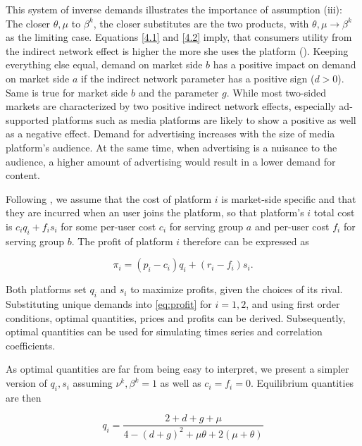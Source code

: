 \documentclass[12pt,a4paper,notitlepage]{article}
\begin{document}
This system of inverse demands illustrates the importance of assumption (iii): The closer $\theta, \mu$ to $\beta^k$, the closer substitutes are the two products, with $\theta, \mu \to \beta^ k$ as the limiting case. Equations \ref{4.1} and \ref{4.2} imply, that consumers utility from the indirect network effect is higher the more she uses the platform (\cite{kind_business_2009}). Keeping everything else equal, demand on market side $b$ has a positive impact on demand on market side $a$ if the indirect network parameter has a positive sign ($d > 0$). Same is true for market side $b$ and the parameter $g$. While most two-sided markets are characterized by two positive indirect network effects, especially ad-supported platforms such as media platforms are likely to show a positive as well as a negative effect. Demand for advertising increases with the size of media platform's audience. At the same time, when advertising is a nuisance to the audience, a higher amount of advertising would result in a lower demand for content.

Following \cite{armstrong_competition_2006}, we assume that the cost of platform $i$ is market-side specific and that they are incurred when an user joins the platform, so that platform's $i$ total cost is $c_i q_i+f_i s_i$ for some per-user cost $c_i$ for serving group $a$ and per-user cost $f_i$ for serving group $b$. The profit of platform $i$ therefore can be expressed as 

\begin{equation}\label{eq:profit}
\pi_i=(p_i-c_i)q_i+(r_i-f_i)s_i.
\end{equation}

Both platforms set $q_i$ and $s_i$ to maximize profits, given the choices of its rival. Substituting unique demands into \ref{eq:profit} for $i=1,2$, and using first order conditions, optimal quantities, prices and profits can be derived. Subsequently, optimal quantities can be used for simulating times series and correlation coefficients. 


 As optimal quantities are far from being easy to interpret, we present a simpler version of $q_i, s_i$ assuming $\nu^k, \beta^k=1$  as well as $c_i=f_i=0$. Equilibrium quantities are then

\begin{equation}\label{eq_quantities1}
	q_i=\frac{2+d+g+\mu}{4-(d+g)^2+\mu\theta+2(\mu+\theta)}
\end{equation}
\end{document}
